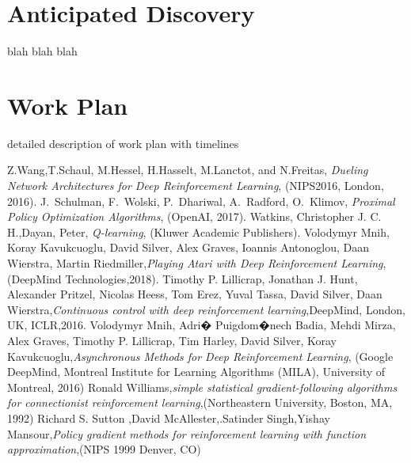 \documentclass[journal,onecolumn]{IEEEtran}
\begin{document}
\section{Anticipated Discovery}
blah blah blah
\section{Work Plan}
detailed description of work plan with timelines
\begin{thebibliography}{}\label{sec:TeXbooks}
 Z.Wang,T.Schaul, M.Hessel, H.Hasselt, M.Lanctot, and N.Freitas, \textit{Dueling Network Architectures for Deep Reinforcement Learning}, (NIPS2016, London, 2016).
 J.~Schulman, F.~Wolski, P.~Dhariwal, A.~Radford, O.~Klimov, \textit{Proximal Policy Optimization Algorithms}, (OpenAI, 2017).
 Watkins, Christopher J. C. H.,Dayan, Peter, \textit{Q-learning}, (Kluwer Academic Publishers).
Volodymyr Mnih, Koray Kavukcuoglu, David Silver, Alex Graves, Ioannis Antonoglou, Daan Wierstra, Martin Riedmiller,\textit{Playing Atari with Deep Reinforcement Learning},(DeepMind Technologies,2018).
Timothy P. Lillicrap, Jonathan J. Hunt, Alexander Pritzel, Nicolas Heess, Tom Erez, Yuval Tassa, David Silver, Daan Wierstra,\textit{Continuous control with deep reinforcement learning},{DeepMind, London, UK, ICLR,2016}.
Volodymyr Mnih, Adri� Puigdom�nech Badia, Mehdi Mirza, Alex Graves, Timothy P. Lillicrap, Tim Harley, David Silver, Koray Kavukcuoglu,\textit{Asynchronous Methods for Deep Reinforcement Learning}, (Google DeepMind, Montreal Institute for Learning Algorithms (MILA), University of Montreal, 2016)
Ronald Williams,\textit{simple statistical gradient-following algorithms for connectionist reinforcement learning},(Northeastern University, Boston, MA, 1992)
Richard S. Sutton	,David McAllester,.Satinder Singh,Yishay Mansour,\textit{Policy gradient methods for reinforcement learning with function approximation},(NIPS 1999 Denver, CO)

\end{thebibliography}
\end{document}
